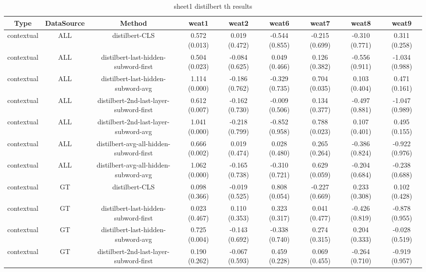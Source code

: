 \begin{sidewaystable}[htb]
    \centering
    \caption{sheet1 distilbert th results}
    \label{appendix_tab:sheet1_distilbert_th_results}
    \small
    \begin{tabular}{@{}ccccccccc@{}}
        \toprule
        Type & DataSource & Method & weat1 & weat2 & weat6 & weat7 & weat8 & weat9 \\
        \midrule
        contextual & ALL & distilbert-CLS & 0.572 (0.013) & 0.019 (0.472) & -0.544 (0.855) & -0.215 (0.699) & -0.310 (0.771) & 0.311 (0.258) \\
        contextual & ALL & distilbert-last-hidden-subword-first & 0.504 (0.023) & -0.084 (0.625) & 0.049 (0.466) & 0.126 (0.382) & -0.556 (0.911) & -1.034 (0.988) \\
        contextual & ALL & distilbert-last-hidden-subword-avg & 1.114 (0.000) & -0.186 (0.762) & -0.329 (0.735) & 0.704 (0.035) & 0.103 (0.404) & 0.471 (0.161) \\
        contextual & ALL & distilbert-2nd-last-layer-subword-first & 0.612 (0.007) & -0.162 (0.730) & -0.009 (0.506) & 0.134 (0.377) & -0.497 (0.881) & -1.047 (0.989) \\
        contextual & ALL & distilbert-2nd-last-layer-subword-avg & 1.041 (0.000) & -0.218 (0.799) & -0.852 (0.958) & 0.788 (0.023) & 0.107 (0.401) & 0.495 (0.155) \\
        contextual & ALL & distilbert-avg-all-hidden-subword-first & 0.666 (0.002) & 0.019 (0.474) & 0.028 (0.480) & 0.265 (0.264) & -0.386 (0.824) & -0.922 (0.976) \\
        contextual & ALL & distilbert-avg-all-hidden-subword-avg & 1.062 (0.000) & -0.165 (0.738) & -0.310 (0.721) & 0.629 (0.059) & -0.204 (0.684) & -0.238 (0.688) \\
        contextual & GT & distilbert-CLS & 0.098 (0.366) & -0.019 (0.525) & 0.808 (0.054) & -0.227 (0.669) & 0.233 (0.308) & 0.102 (0.428) \\
        contextual & GT & distilbert-last-hidden-subword-first & 0.023 (0.467) & 0.110 (0.353) & 0.323 (0.317) & 0.041 (0.477) & -0.426 (0.819) & -0.878 (0.955) \\
        contextual & GT & distilbert-last-hidden-subword-avg & 0.725 (0.004) & -0.143 (0.692) & -0.338 (0.740) & 0.274 (0.315) & 0.204 (0.333) & -0.028 (0.519) \\
        contextual & GT & distilbert-2nd-last-layer-subword-first & 0.190 (0.262) & -0.067 (0.593) & 0.459 (0.228) & 0.069 (0.455) & -0.264 (0.710) & -0.919 (0.957) \\

\end{tabular}
\end{sidewaystable}

